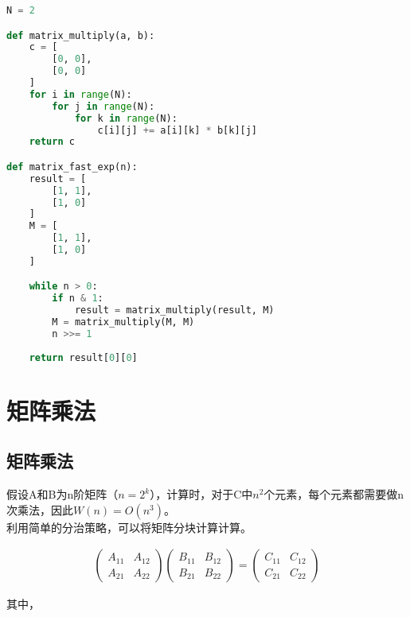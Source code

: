 
\begin{lstlisting}[language=Python]
N = 2

def matrix_multiply(a, b):
    c = [
        [0, 0],
        [0, 0]
    ]
    for i in range(N):
        for j in range(N):
            for k in range(N):
                c[i][j] += a[i][k] * b[k][j]
    return c

def matrix_fast_exp(n):
    result = [
        [1, 1],
        [1, 0]
    ]
    M = [
        [1, 1],
        [1, 0]
    ]

    while n > 0:
        if n & 1:
            result = matrix_multiply(result, M)
        M = matrix_multiply(M, M)
        n >>= 1
    
    return result[0][0]
\end{lstlisting}

\newpage

\section{矩阵乘法}

\subsection{矩阵乘法}

假设A和B为n阶矩阵（$ n = 2^k $），计算时，对于C中$ n^2 $个元素，每个元素都需要做n次乘法，因此$ W(n) = O(n^3) $。 \\

利用简单的分治策略，可以将矩阵分块计算计算。

\vspace{-0.5cm}

\begin{align*}
    \left( \begin{matrix}
        A_{11} & A_{12} \\
        A_{21} & A_{22}
    \end{matrix} \right)
    \left( \begin{matrix}
        B_{11} & B_{12} \\
        B_{21} & B_{22}
    \end{matrix} \right)
    =
    \left( \begin{matrix}
        C_{11} & C_{12} \\
        C_{21} & C_{22}
    \end{matrix} \right)
\end{align*}

其中，

